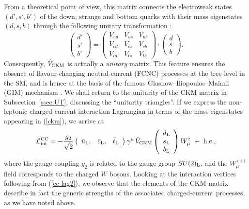 \documentclass[11pt]{cernrep}
\begin{document}
From a theoretical point of view, this matrix connects the electroweak 
states $(d',s',b')$ of the down, strange and bottom quarks with their 
mass eigenstates $(d,s,b)$ through the following unitary transformation 
\cite{buchmueller}:
\begin{equation}\label{ckm}
\left(\begin{array}{c}
d'\\
s'\\
b'
\end{array}\right)=\left(\begin{array}{ccc}
V_{ud}&V_{us}&V_{ub}\\
V_{cd}&V_{cs}&V_{cb}\\
V_{td}&V_{ts}&V_{tb}
\end{array}\right)\cdot
\left(\begin{array}{c}
d\\
s\\
b
\end{array}\right).
\end{equation}
Consequently, $\hat V_{\rm CKM}$ is actually a {\it unitary} matrix.
This feature ensures the absence of flavour-changing neutral-current 
(FCNC) processes at the tree level in the SM, and is hence at the basis 
of the famous Glashow--Iliopoulos--Maiani (GIM) mechanism \cite{GIM}. 
We shall return to the unitarity of the CKM matrix in
Subsection~\ref{ssec:UT}, discussing the ``unitarity triangles''.
If we express the non-leptonic charged-current interaction Lagrangian 
in terms of the mass eigenstates appearing in (\ref{ckm}), we arrive at 
\begin{equation}\label{cc-lag2}
{\cal L}_{\mbox{{\scriptsize int}}}^{\mbox{{\scriptsize CC}}}=
-\frac{g_2}{\sqrt{2}}\left(\begin{array}{ccc}
\bar u_{\mbox{{\scriptsize L}}},& \bar c_{\mbox{{\scriptsize L}}},
&\bar t_{\mbox{{\scriptsize L}}}\end{array}\right)\gamma^\mu\,\hat
V_{\mbox{{\scriptsize CKM}}}
\left(\begin{array}{c}
d_{\mbox{{\scriptsize L}}}\\
s_{\mbox{{\scriptsize L}}}\\
b_{\mbox{{\scriptsize L}}}
\end{array}\right)W_\mu^\dagger\,\,+\,\,\mbox{h.c.,}
\end{equation}
where the gauge coupling $g_2$ is related to the gauge group 
$SU(2)_{\mbox{{\scriptsize L}}}$, and the $W_\mu^{(\dagger)}$ field 
corresponds to the charged $W$ bosons. Looking at the
interaction vertices following from (\ref{cc-lag2}), we observe 
that the elements of the CKM matrix describe in fact the generic
strengths of the associated charged-current processes, as we have 
noted above. 
\end{document}
